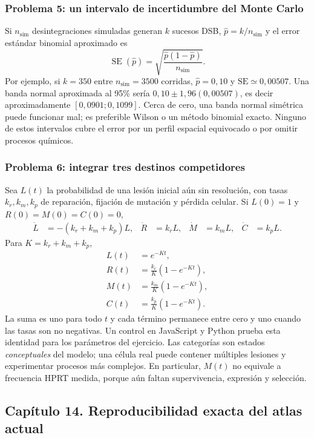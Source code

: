 \subsubsection{Problema 5: un intervalo de incertidumbre del Monte Carlo}
Si $n_\mathrm{sim}$ desintegraciones simuladas generan $k$ sucesos DSB,
$\widehat p=k/n_\mathrm{sim}$ y el error estándar binomial aproximado es
\[
\operatorname{SE}(\widehat p)=
\sqrt{\frac{\widehat p(1-\widehat p)}{n_\mathrm{sim}}}.
\]
Por ejemplo, si $k=350$ entre $n_\mathrm{sim}=3500$ corridas,
$\widehat p=0,10$ y $\mathrm{SE}\simeq0,00507$.
Una banda normal aproximada al 95\% sería $0,10\pm1,96(0,00507)$,
es decir aproximadamente $[0,0901;0,1099]$. Cerca de cero, una banda
normal simétrica puede funcionar mal; es preferible Wilson o un método
binomial exacto. Ninguno de estos intervalos cubre el error por un perfil
espacial equivocado o por omitir procesos químicos.

\subsubsection{Problema 6: integrar tres destinos competidores}
Sea $L(t)$ la probabilidad de una lesión inicial aún sin resolución,
con tasas $k_r,k_m,k_p$ de reparación, fijación de mutación y pérdida
celular. Si $L(0)=1$ y $R(0)=M(0)=C(0)=0$,
\begin{align}
\dot L&=-(k_r+k_m+k_p)L,&
\dot R&=k_rL,&\dot M&=k_mL,&\dot C&=k_pL.
\end{align}
Para $K=k_r+k_m+k_p$,
\begin{align}
L(t)&=e^{-Kt},\\
R(t)&=\frac{k_r}{K}(1-e^{-Kt}),\\
M(t)&=\frac{k_m}{K}(1-e^{-Kt}),\\
C(t)&=\frac{k_p}{K}(1-e^{-Kt}).
\end{align}
La suma es uno para todo $t$ y cada término permanece entre cero y uno
cuando las tasas son no negativas. Un control en JavaScript y Python prueba
esta identidad para los parámetros del ejercicio. Las categorías son
estados \emph{conceptuales} del modelo; una célula real puede contener
múltiples lesiones y experimentar procesos más complejos. En particular,
$M(t)$ no equivale a frecuencia HPRT medida, porque aún faltan supervivencia,
expresión y selección.

\clearpage
\subsection{Capítulo 14. Reproducibilidad exacta del atlas actual}
\label{ampliacion-software}

